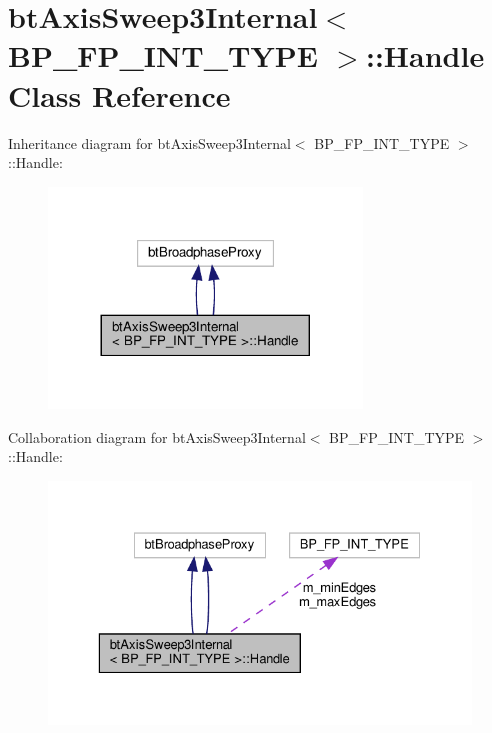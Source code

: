 \hypertarget{classbtAxisSweep3Internal_1_1Handle}{}\section{bt\+Axis\+Sweep3\+Internal$<$ B\+P\+\_\+\+F\+P\+\_\+\+I\+N\+T\+\_\+\+T\+Y\+PE $>$\+:\+:Handle Class Reference}
\label{classbtAxisSweep3Internal_1_1Handle}


Inheritance diagram for bt\+Axis\+Sweep3\+Internal$<$ B\+P\+\_\+\+F\+P\+\_\+\+I\+N\+T\+\_\+\+T\+Y\+PE $>$\+:\+:Handle\+:
\nopagebreak
\begin{figure}[H]
\begin{center}
\leavevmode
\includegraphics[width=236pt]{classbtAxisSweep3Internal_1_1Handle__inherit__graph}
\end{center}
\end{figure}


Collaboration diagram for bt\+Axis\+Sweep3\+Internal$<$ B\+P\+\_\+\+F\+P\+\_\+\+I\+N\+T\+\_\+\+T\+Y\+PE $>$\+:\+:Handle\+:
\nopagebreak
\begin{figure}[H]
\begin{center}
\leavevmode
\includegraphics[width=329pt]{classbtAxisSweep3Internal_1_1Handle__coll__graph}
\end{center}
\end{figure}
